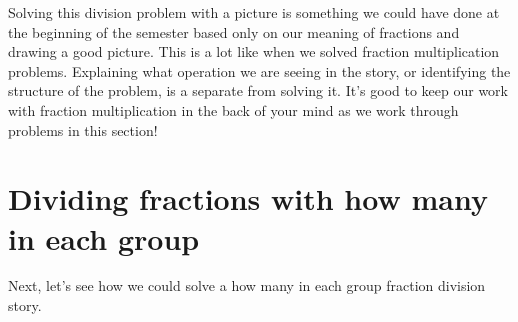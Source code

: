 \documentclass{ximera}
\begin{document}
Solving this division problem with a picture is something we could have done at the beginning of the semester based only on our meaning of fractions and drawing a good picture. This is a lot like when we solved fraction multiplication problems. Explaining what operation we are seeing in the story, or identifying the structure of the problem, is a separate from solving it. It's good to keep our work with fraction multiplication in the back of your mind as we work through problems in this section!

\section{Dividing fractions with how many in each group}

Next, let's see how we could solve a how many in each group fraction division story.
\end{document}

